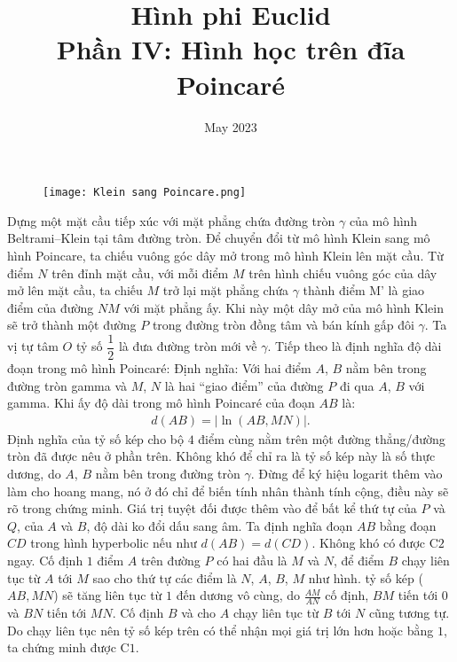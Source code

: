 \documentclass{article}
\title{Hình phi Euclid\\
Phần IV: Hình học trên đĩa Poincar\'e}
\date{May 2023}
\begin{document}
\maketitle

\begin{figure}[H]
		\vspace*{-5pt}
		\centering
		\captionsetup{labelformat= empty, justification=centering}
		\texttt{[image: Klein sang Poincare.png]}
		\vspace*{-10pt}
	\end{figure}
	Dựng một mặt cầu tiếp xúc với mặt phẳng chứa đường tròn $\gamma$ của mô hình Beltrami--Klein tại tâm đường tròn. Để chuyển đổi từ mô hình Klein sang mô hình Poincare, ta chiếu vuông góc dây mở trong mô hình Klein lên mặt cầu. Từ điểm $N$ trên đỉnh mặt cầu, với mỗi điểm $M$ trên hình chiếu vuông góc của dây mở lên mặt cầu, ta chiếu $M$ trở lại mặt phẳng chứa $\gamma$ thành điểm M' là giao điểm của đường $NM$ với mặt phẳng ấy. Khi này một dây mở của mô hình Klein sẽ trở thành một đường $P$ trong đường tròn đồng tâm và bán kính gấp đôi $\gamma$. Ta vị tự tâm $O$ tỷ số $\dfrac{1}{2}$ là đưa đường tròn mới về $\gamma$.
	\vskip 0.1cm
	Tiếp theo là định nghĩa độ dài đoạn trong mô hình Poincaré:
	\vskip 0.1cm
	Định nghĩa: Với hai điểm $A$, $B$ nằm bên trong đường tròn gamma và $M$, $N$ là hai ``giao điểm'' của đường $P$ đi qua $A$, $B$ với gamma. Khi ấy độ dài trong mô hình Poincaré của đoạn $AB$ là:
	\begin{align*}
		 d(AB) = |\ln{(AB, MN)}|.
	\end{align*} 
	Định nghĩa của tỷ số kép cho bộ $4$ điểm cùng nằm trên một đường thẳng/đường tròn đã được nêu ở phần trên. Không khó để chỉ ra là tỷ số kép này là số thực dương, do $A$, $B$ nằm bên trong đường tròn $\gamma$. Đừng để ký hiệu logarit thêm vào làm cho hoang mang, nó ở đó chỉ để biến tính nhân thành tính cộng, điều này sẽ rõ trong chứng minh. Giá trị tuyệt đối được thêm vào để bất kể thứ tự của $P$ và $Q$, của $A$ và $B$, độ dài ko đổi dấu sang âm.
	\vskip 0.1cm
	Ta định nghĩa đoạn $AB$ bằng đoạn $CD$ trong hình hyperbolic nếu như $d(AB) = d(CD)$. Không khó có được C$2$ ngay. 
	Cố định $1$ điểm $A$ trên đường $P$ có hai đầu là $M$ và $N$, để điểm $B$ chạy liên tục từ $A$ tới $M$ sao cho thứ tự các điểm là $N$, $A$, $B$, $M$ như hình. tỷ số kép ($AB, MN$) sẽ tăng liên tục từ $1$ đến dương vô cùng, do $\frac{AM}{AN}$ cố định, $BM$ tiến tới $0$ và $BN$ tiến tới $MN$. Cố định $B$ và cho $A$ chạy liên tục từ $B$ tới $N$ cũng tương tự. Do chạy liên tục nên tỷ số kép trên có thể nhận mọi giá trị lớn hơn hoặc bằng $1$, ta chứng minh được C$1$. 
\end{document}
